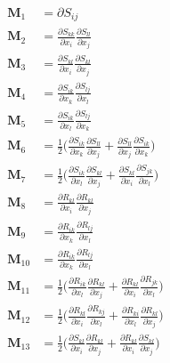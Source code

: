 %
\begin{subequations}
\begin{align}
	\label{E:36}
	\mathbf{M}_1  &= \partial S_{ij}  \\
	\mathbf{M}_2  &= \frac{\partial S_{kk}}{\partial x_i}
					 \frac{\partial S_{ll}}{\partial x_j} \\
	\mathbf{M}_3  &= \frac{\partial S_{kl}}{\partial x_i}
					 \frac{\partial S_{kl}}{\partial x_j} \\
	\mathbf{M}_4  &= \frac{\partial S_{ik}}{\partial x_k}
					 \frac{\partial S_{lj}}{\partial x_l} \\	
	\mathbf{M}_5  &= \frac{\partial S_{ik}}{\partial x_l}
					 \frac{\partial S_{lj}}{\partial x_k} \\	
	\mathbf{M}_6  &= \frac{1}{2} 
			  \bigg( \frac{\partial S_{ik}}{\partial x_k}
					 \frac{\partial S_{ll}}{\partial x_j} 
				  	+ 
					 \frac{\partial S_{ll}}{\partial x_j} 
					 \frac{\partial S_{ik}}{\partial x_k} \bigg) \\	
	\mathbf{M}_7  &= \frac{1}{2} 
			  \bigg( \frac{\partial S_{ik}}{\partial x_l}
					 \frac{\partial S_{kl}}{\partial x_j} 
				    + 
					 \frac{\partial S_{kl}}{\partial x_i} 
					 \frac{\partial S_{jk}}{\partial x_l} \bigg) \\				 
	\mathbf{M}_8  &= \frac{\partial R_{kl}}{\partial x_i}
					 \frac{\partial R_{kl}}{\partial x_j} \\
	\mathbf{M}_9  &= \frac{\partial R_{ik}}{\partial x_k}
					 \frac{\partial R_{lj}}{\partial x_l} \\
	\mathbf{M}_{10} &= \frac{\partial R_{ik}}{\partial x_k}
					 \frac{\partial R_{lj}}{\partial x_l} \\
	\mathbf{M}_{11}  &= \frac{1}{2} 
			  \bigg( \frac{\partial R_{ik}}{\partial x_l}
					 \frac{\partial R_{kl}}{\partial x_j} 
				  	+ 
					 \frac{\partial R_{kl}}{\partial x_i} 
					 \frac{\partial R_{jk}}{\partial x_l} \bigg) \\
	\mathbf{M}_{12}  &= \frac{1}{2} 
			  \bigg( \frac{\partial R_{kl}}{\partial x_i}
					 \frac{\partial R_{kj}}{\partial x_l} 
				  	+ 
					 \frac{\partial R_{ki}}{\partial x_l} 
					 \frac{\partial R_{kl}}{\partial x_j} \bigg)  \\	
	\mathbf{M}_{13}  &= \frac{1}{2} 
			  \bigg( \frac{\partial S_{kl}}{\partial x_i}
					 \frac{\partial R_{kl}}{\partial x_j} 
				  	+ 
					 \frac{\partial R_{kl}}{\partial x_i}
					 \frac{\partial S_{kl}}{\partial x_j}  \bigg)  \\

\end{align}
\end{subequations}
